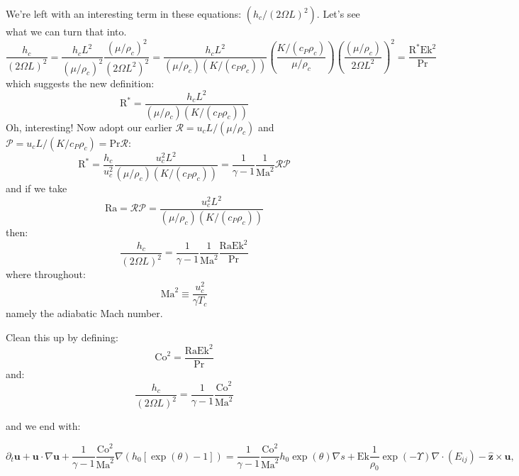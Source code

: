\documentclass{aastex62}
\newcommand{\del}{\nabla}
\renewcommand{\vec}{\boldsymbol}
\newcommand{\scrR}{\mathcal{R}}
\newcommand{\scrP}{\mathcal{P}}
\begin{document}
We're left with an interesting term in these equations: $\left(h_c/(2\Omega L)^2\right)$.  Let's see what we can turn that into.
\begin{equation}
\frac{h_c}{(2\Omega L)^2}
= \frac{h_c L^2}{(\mu/\rho_c)^2} \frac{(\mu/\rho_c)^2}{(2\Omega L^2)^2}
= \frac{h_c L^2}{(\mu/\rho_c)(K/(c_P \rho_c))}\left(\frac{K/(c_P \rho_c)}{\mu/\rho_c}\right) \left(\frac{(\mu/\rho_c)}{2\Omega L^2}\right)^2
= \frac{\mathrm{R}^* \mathrm{Ek}^2}{\mathrm{Pr}}
\end{equation}
which suggests the new definition:
\begin{equation}
\mathrm{R}^* = \frac{h_c L^2}{(\mu/\rho_c)(K/(c_P \rho_c))}
\end{equation}
Oh, interesting!  Now adopt our earlier $\scrR = u_c L/(\mu/\rho_c)$ and $\scrP = u_c L/(K/c_P \rho_c) = \mathrm{Pr}\scrR$:
\begin{equation}
\mathrm{R}^* = \frac{h_c}{u_c^2}\frac{u_c^2 L^2}{(\mu/\rho_c)(K/(c_P \rho_c))} = \frac{1}{\gamma-1}\frac{1}{\mathrm{Ma}^{2}} \scrR \scrP
\end{equation}
and if we take
\begin{equation}
  \mathrm{Ra} = \scrR \scrP = \frac{u_c^2 L^2}{(\mu/\rho_c)(K/(c_P \rho_c))}
\end{equation}
then:
\begin{equation}
  \frac{h_c}{(2\Omega L)^2} = \frac{1}{\gamma-1}\frac{1}{\mathrm{Ma}^{2}}\frac{\mathrm{Ra}\mathrm{Ek}^2}{\mathrm{Pr}}
\end{equation}
where throughout:
\begin{equation}
  \mathrm{Ma}^{2} \equiv \frac{u_c^2}{\gamma T_c}
\end{equation}
namely the adiabatic Mach number.

Clean this up by defining:
\begin{equation}
  \mathrm{Co}^2 = \frac{\mathrm{Ra}\mathrm{Ek}^2}{\mathrm{Pr}}
\end{equation}
and:
\begin{equation}
  \frac{h_c}{(2\Omega L)^2} = \frac{1}{\gamma-1}\frac{\mathrm{Co}^2}{\mathrm{Ma}^{2}}
\end{equation}

and we end with:

\begin{equation}
  \partial_t \vec{u} + \vec{u}\cdot \del \vec{u} + \frac{1}{\gamma-1}\frac{\mathrm{Co}^2}{\mathrm{Ma}^{2}}\del (h_0[\exp(\theta)-1]) =
  \frac{1}{\gamma-1}\frac{\mathrm{Co}^2}{\mathrm{Ma}^{2}} h_0\exp(\theta)\del s
  + \mathrm{Ek}\frac{1}{\rho_0}\exp(-\Upsilon)\del\cdot (E_{ij}) - \vec{\hat{z}} \times \vec{u},
\end{equation}
\end{document}
